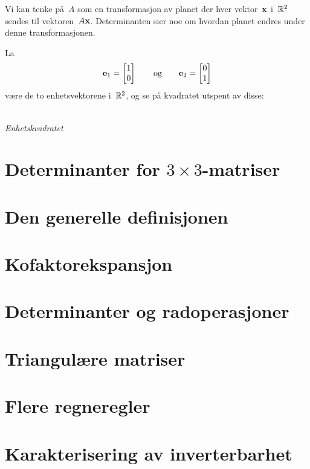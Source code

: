 Vi kan tenke på~$A$ som en transformasjon av planet der hver
vektor~$\mathbf{x}$ i~$\mathbb{R}^2$ sendes til vektoren~$A \mathbf{x}$.  Determinanten
sier noe om hvordan planet endres under denne transformasjonen.

La
\[
\mathbf{e}_1 = \begin{bmatrix} 1 \\ 0 \end{bmatrix}
\qquad\text{og}\qquad
\mathbf{e}_2 = \begin{bmatrix} 0 \\ 1 \end{bmatrix}
\]
være de to enhetsvektorene i~$\mathbb{R}^2$, og se på kvadratet utspent av
disse:
\begin{center}
\\
{\small \textit{Enhetskvadratet}}
\end{center}


\section*{Determinanter for $3 \times 3$-matriser}



\section*{Den generelle definisjonen}



\section*{Kofaktorekspansjon}



\section*{Determinanter og radoperasjoner}



\section*{Triangulære matriser}



\section*{Flere regneregler}



\section*{Karakterisering av inverterbarhet}


\kapittelslutt

